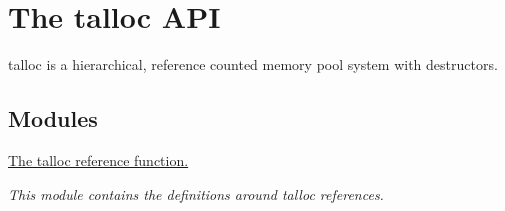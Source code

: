 \hypertarget{group__talloc}{}\section{The talloc A\+P\+I}
\label{group__talloc}


talloc is a hierarchical, reference counted memory pool system with destructors.  


\subsection*{Modules}
\begin{DoxyCompactItemize}
\item 
\hyperlink{group__talloc__ref}{The talloc reference function.}
\begin{DoxyCompactList}\small\item\em This module contains the definitions around talloc references. \end{DoxyCompactList}\end{DoxyCompactItemize}
